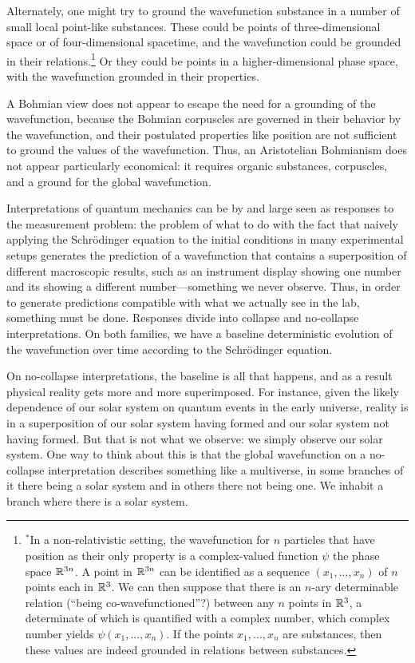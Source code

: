 Alternately, one might try to ground the wavefunction substance in a number of small local point-like substances.
These could be points of three-dimensional space or of four-dimensional spacetime, and the wavefunction could be 
grounded in their relations.\footnote{$^*$In a non-relativistic setting, the wavefunction for $n$ particles that 
have position as their only property is a complex-valued function $\psi$ the phase space $\mathbb R^{3n}$. A point in $\mathbb R^{3n}$ can 
be identified as a sequence $(x_1,...,x_n)$ of $n$ points each in $\mathbb R^3$. We can then suppose that there is an 
$n$-ary determinable relation (``being co-wavefunctioned''?) between any $n$ points in $\mathbb R^3$, a determinate of which is 
quantified with a complex number, which complex number yields $\psi(x_1,...,x_n)$. If the points $x_1,...,x_n$ are 
substances, then these values are indeed grounded in relations between substances.} Or they could be points in a higher-dimensional
phase space, with the wavefunction grounded in their properties. 

A Bohmian view does not appear to escape the need for a grounding of the wavefunction, because the Bohmian corpuscles are 
governed in their behavior by the wavefunction, and their postulated properties like position are not sufficient to ground the values of the wavefunction. Thus, an Aristotelian Bohmianism does not appear particularly economical: it requires organic
substances, corpuscles, and a ground for the global wavefunction.

Interpretations of quantum mechanics can be by and large seen as responses to the measurement problem: the problem of 
what to do with the fact that naively applying the Schr\"{o}dinger equation to the initial conditions in many experimental 
setups generates the prediction of a wavefunction that contains a superposition of different macroscopic results, such as 
an instrument display showing one number and its showing a different number---something we never observe. Thus, in order 
to generate predictions compatible with what we actually see in the lab, something must be done. Responses 
divide into collapse and no-collapse interpretations. On both families,
we have a baseline deterministic evolution of the wavefunction over time according to the Schr\"{o}dinger equation.

On no-collapse interpretations, the baseline is all that happens, and as a result physical reality gets more and more 
superimposed. For instance, given the likely dependence of our solar system on quantum events in the early universe,
reality is in a superposition of our solar system having formed and our solar system not having formed. But that is 
not what we observe: we simply observe our solar system. One way to think about this is that the global wavefunction 
on a no-collapse interpretation describes something like a multiverse, in some branches of it there being a solar system and 
in others there not being one. We inhabit a branch where there is a solar system. 

